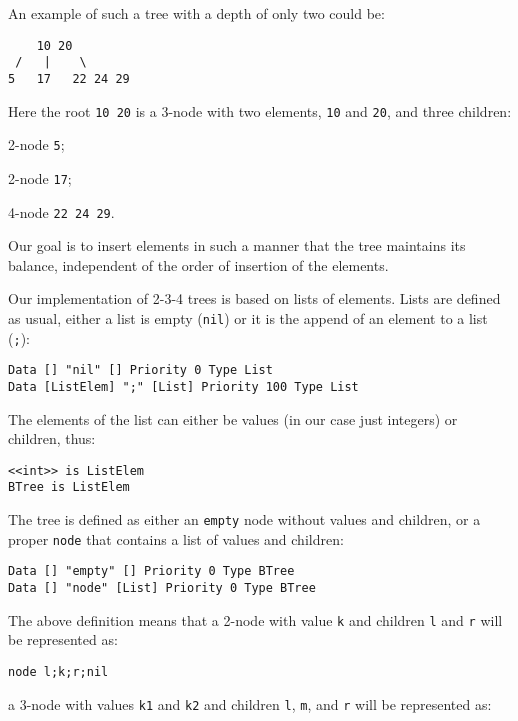 An example of such a tree with a depth of only two could be:

\begin{lstlisting}
    10 20 
 /   |    \
5   17   22 24 29
\end{lstlisting}

Here the root \texttt{10 20} is a 3-node with two elements, \texttt{10} and \texttt{20}, and three children:
\begin{inparaenum}
\item 2-node \texttt{5};
\item 2-node \texttt{17};
\item 4-node \texttt{22 24 29}.
\end{inparaenum}

Our goal is to insert elements in such a manner that the tree maintains its balance, independent of the order of insertion of the elements.

Our implementation of 2-3-4 trees is based on lists of elements. Lists are defined as usual, either a list is empty (\texttt{nil}) or it is the append of an element to a list (\texttt{;}):

\begin{lstlisting}
Data [] "nil" [] Priority 0 Type List
Data [ListElem] ";" [List] Priority 100 Type List
\end{lstlisting}

The elements of the list can either be values (in our case just integers) or children, thus:

\begin{lstlisting}
<<int>> is ListElem
BTree is ListElem
\end{lstlisting}

The tree is defined as either an \texttt{empty} node without values and children, or a proper \texttt{node} that contains a list of values and children:

\begin{lstlisting}
Data [] "empty" [] Priority 0 Type BTree
Data [] "node" [List] Priority 0 Type BTree
\end{lstlisting}

The above definition means that a 2-node with value \texttt{k} and children \texttt{l} and \texttt{r} will be represented as:

\begin{lstlisting}
node l;k;r;nil
\end{lstlisting}

a 3-node with values \texttt{k1} and \texttt{k2} and children \texttt{l}, \texttt{m}, and \texttt{r} will be represented as:


